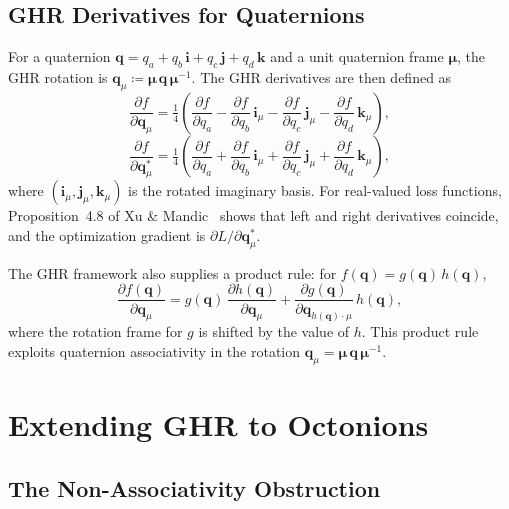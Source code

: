 \documentclass[11pt]{article}
\newcommand{\pd}[2]{\frac{\partial #1}{\partial #2}}
\newcommand{\defeq}{\coloneqq}
\begin{document}
\subsection{GHR Derivatives for Quaternions}

For a quaternion $\mathbf{q} = q_a + q_b\,\mathbf{i} + q_c\,\mathbf{j} + q_d\,\mathbf{k}$
and a unit quaternion frame $\boldsymbol{\mu}$, the GHR rotation is
$\mathbf{q}_\mu \defeq \boldsymbol{\mu}\,\mathbf{q}\,\boldsymbol{\mu}^{-1}$.
The GHR derivatives are then defined as
\begin{equation}
  \pd{f}{\mathbf{q}_\mu}
  = \tfrac{1}{4}\!\left(
      \pd{f}{q_a}
    - \pd{f}{q_b}\,\mathbf{i}_\mu
    - \pd{f}{q_c}\,\mathbf{j}_\mu
    - \pd{f}{q_d}\,\mathbf{k}_\mu
    \right),
\end{equation}
\begin{equation}
  \pd{f}{\mathbf{q}_\mu^*}
  = \tfrac{1}{4}\!\left(
      \pd{f}{q_a}
    + \pd{f}{q_b}\,\mathbf{i}_\mu
    + \pd{f}{q_c}\,\mathbf{j}_\mu
    + \pd{f}{q_d}\,\mathbf{k}_\mu
    \right),
\end{equation}
where $(\mathbf{i}_\mu, \mathbf{j}_\mu, \mathbf{k}_\mu)$ is the rotated
imaginary basis.  For real-valued loss functions, Proposition~4.8 of
Xu \& Mandic~\cite{xu2015ghr} shows that left and right derivatives coincide,
and the optimization gradient is $\partial L/\partial\mathbf{q}^*_\mu$.

The GHR framework also supplies a product rule: for
$f(\mathbf{q}) = g(\mathbf{q})\,h(\mathbf{q})$,
\begin{equation}
  \pd{f(\mathbf{q})}{\mathbf{q}_\mu}
  = g(\mathbf{q})\,\pd{h(\mathbf{q})}{\mathbf{q}_\mu}
  + \pd{g(\mathbf{q})}{\mathbf{q}_{h(\mathbf{q})\cdot\mu}}\,h(\mathbf{q}),
\end{equation}
where the rotation frame for $g$ is shifted by the value of $h$.  This product
rule exploits quaternion associativity in the rotation $\mathbf{q}_\mu = \boldsymbol{\mu}\,\mathbf{q}\,\boldsymbol{\mu}^{-1}$.

\section{Extending GHR to Octonions}

\subsection{The Non-Associativity Obstruction}
\end{document}
